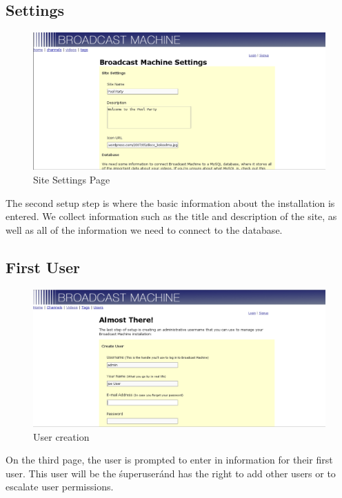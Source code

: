 \documentclass[a4paper,12pt]{report}
\begin{document}
\subsection{Settings}
\begin{figure}[h!]
\begin{center}
\includegraphics[width=150mm]{./images/setup2.png}
\caption{Site Settings Page}
\end{center}
\end{figure}

The second setup step is where the basic information about the installation is entered.
We collect information such as the title and description of the site, as well as all of the information we need to connect to the database.

\subsection{First User}
\begin{figure}[h!]
\begin{center}
\includegraphics[width=150mm]{./images/setup3.png}
\caption{User creation}
\end{center}
\end{figure}
On the third page, the user is prompted to enter in information for their first user.
This user will be the \'superuser\' and has the right to add other users or to escalate user permissions.
\end{document}
